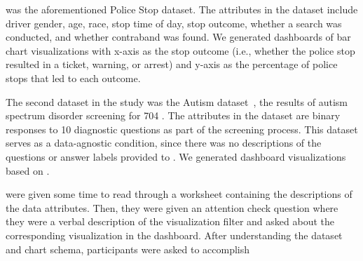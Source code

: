  was the aforementioned
Police Stop dataset.
The attributes in the dataset
include driver gender, age, race, stop time of day,
stop outcome, whether a search was conducted,
and whether contraband was found.
We generated dashboards of bar chart visualizations
with x-axis as the stop outcome
(i.e., whether the police stop resulted in a
ticket, warning, or arrest) and y-axis as the percentage of police stops that led to each outcome. %

The second dataset in the study
was the Autism dataset~\cite{autism},
 the results of autism spectrum
disorder screening for 704 .
The attributes in the dataset are binary responses
to 10 diagnostic questions
as part of the screening process.
This dataset serves as a data-agnostic condition,
since there was no descriptions
of the questions or answer labels provided to
.
We generated dashboard visualizations
based on .

were given some time to read through a worksheet
containing the descriptions of the data attributes.
Then, they were given an attention check question
where they were
a verbal description of the visualization filter
and asked about the corresponding visualization in the dashboard.
After understanding the dataset and chart schema,
participants were asked to accomplish

